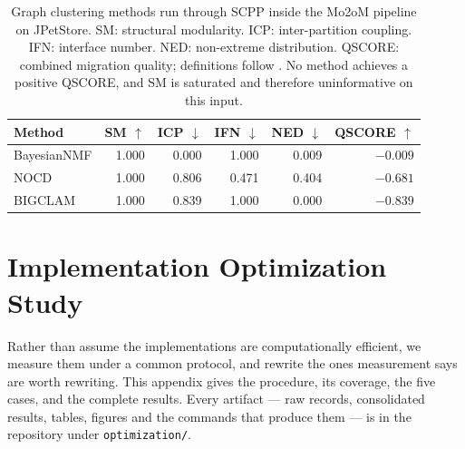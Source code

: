 \documentclass[twoside,11pt]{article}
\begin{document}
\begin{table}[ht]
\centering
\caption{Graph clustering methods run through SCPP inside the Mo2oM pipeline
on JPetStore. SM: structural modularity. ICP: inter-partition coupling. IFN:
interface number. NED: non-extreme distribution. QSCORE: combined migration
quality; definitions follow \citet{ziabakhsh2025extracting}. No method
achieves a positive QSCORE, and SM is saturated and therefore uninformative
on this input.}
\label{tab:mo2om_comparison}
\begin{tabular}{lrrrrr}
\toprule
Method & SM $\uparrow$ & ICP $\downarrow$ & IFN $\downarrow$ & NED $\downarrow$ & QSCORE $\uparrow$ \\
\midrule
BayesianNMF & 1.000 & 0.000 & 1.000 & 0.009 & $-0.009$ \\
NOCD        & 1.000 & 0.806 & 0.471 & 0.404 & $-0.681$ \\
BIGCLAM     & 1.000 & 0.839 & 1.000 & 0.000 & $-0.839$ \\
\bottomrule
\end{tabular}
\end{table}

%

\section{Implementation Optimization Study}\label{app:optimization}

Rather than assume the implementations are computationally efficient, we
measure them under a common protocol, and rewrite the ones measurement says
are worth rewriting. This appendix gives the procedure, its coverage, the
five cases, and the complete results. Every artifact --- raw records,
consolidated results, tables, figures and the commands that produce them ---
is in the repository under \texttt{optimization/}.
\end{document}
